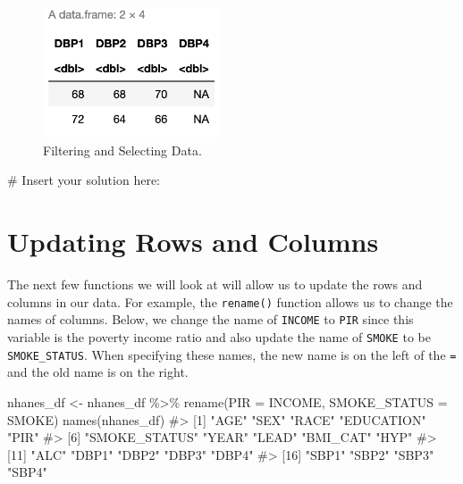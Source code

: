 \documentclass[
  letterpaper,
]{krantz}
\makeatletter
\newenvironment{Shaded}{\begin{snugshade}}{\end{snugshade}}
\newcommand{\AttributeTok}[1]{\textcolor[rgb]{0.40,0.45,0.13}{#1}}
\newcommand{\CommentTok}[1]{\textcolor[rgb]{0.37,0.37,0.37}{#1}}
\newcommand{\FunctionTok}[1]{\textcolor[rgb]{0.28,0.35,0.67}{#1}}
\newcommand{\NormalTok}[1]{\textcolor[rgb]{0.00,0.23,0.31}{#1}}
\newcommand{\OtherTok}[1]{\textcolor[rgb]{0.00,0.23,0.31}{#1}}
\newcommand{\SpecialCharTok}[1]{\textcolor[rgb]{0.37,0.37,0.37}{#1}}
\newenvironment{kframe}{%
\medskip{}
\setlength{\fboxsep}{.8em}
 \def\at@end@of@kframe{}%
 \ifinner\ifhmode%
  \def\at@end@of@kframe{\end{minipage}}%
  \begin{minipage}{\columnwidth}%
 \fi\fi%
 \def\FrameCommand##1{\hskip\@totalleftmargin \hskip-\fboxsep
 \colorbox{shadecolor}{##1}\hskip-\fboxsep
     \hskip-\linewidth \hskip-\@totalleftmargin \hskip\columnwidth}%
 \MakeFramed {\advance\hsize-\width
   \@totalleftmargin\z@ \linewidth\hsize
   \@setminipage}}%
 {\par\unskip\endMakeFramed%
 \at@end@of@kframe}
\renewenvironment{Shaded}{\begin{kframe}}{\end{kframe}}
\makeatother
\begin{document}
\begin{figure}

{\centering \includegraphics[width=2.08333in,height=\textheight]{book/images/5-practicequestion1answer.png}

}

\caption{\label{fig-pq1}Filtering and Selecting Data.}

\end{figure}

\begin{Shaded}
\begin{Highlighting}[]
\CommentTok{\# Insert your solution here:}
\end{Highlighting}
\end{Shaded}

\hypertarget{updating-rows-and-columns}{%
\section{Updating Rows and Columns}\label{updating-rows-and-columns}}

The next few functions we will look at will allow us to update the rows
and columns in our data. For example, the \texttt{rename()} function
allows us to change the names of columns. Below, we change the name of
\texttt{INCOME} to \texttt{PIR} since this variable is the poverty
income ratio and also update the name of \texttt{SMOKE} to be
\texttt{SMOKE\_STATUS}. When specifying these names, the new name is on
the left of the \texttt{=} and the old name is on the right.

\begin{Shaded}
\begin{Highlighting}[]
\NormalTok{nhanes\_df }\OtherTok{\textless{}{-}}\NormalTok{ nhanes\_df }\SpecialCharTok{\%\textgreater{}\%} \FunctionTok{rename}\NormalTok{(}\AttributeTok{PIR =}\NormalTok{ INCOME, }\AttributeTok{SMOKE\_STATUS =}\NormalTok{ SMOKE)}
\FunctionTok{names}\NormalTok{(nhanes\_df)}
\CommentTok{\#\textgreater{}  [1] "AGE"          "SEX"          "RACE"         "EDUCATION"    "PIR"         }
\CommentTok{\#\textgreater{}  [6] "SMOKE\_STATUS" "YEAR"         "LEAD"         "BMI\_CAT"      "HYP"         }
\CommentTok{\#\textgreater{} [11] "ALC"          "DBP1"         "DBP2"         "DBP3"         "DBP4"        }
\CommentTok{\#\textgreater{} [16] "SBP1"         "SBP2"         "SBP3"         "SBP4"}
\end{Highlighting}
\end{Shaded}
\end{document}
